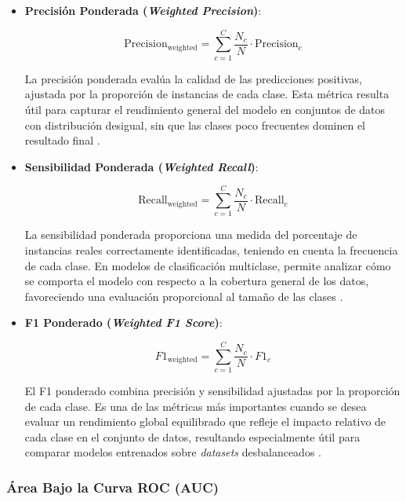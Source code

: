 \begin{itemize}

\item \textbf{Precisión Ponderada (\textit{Weighted Precision})}:

\begin{equation}
\text{Precision}_{\text{weighted}} = \sum_{c=1}^{C} \frac{N_c}{N} \cdot \text{Precision}_c
\end{equation}

La precisión ponderada evalúa la calidad de las predicciones positivas, ajustada por la proporción de instancias de cada clase. Esta métrica resulta útil para capturar el rendimiento general del modelo en conjuntos de datos con distribución desigual, sin que las clases poco frecuentes dominen el resultado final \cite{Girosi2004}.

\item \textbf{Sensibilidad Ponderada (\textit{Weighted Recall})}:

\begin{equation}
\text{Recall}_{\text{weighted}} = \sum_{c=1}^{C} \frac{N_c}{N} \cdot \text{Recall}_c
\end{equation}

La sensibilidad ponderada proporciona una medida del porcentaje de instancias reales correctamente identificadas, teniendo en cuenta la frecuencia de cada clase. En modelos de clasificación multiclase, permite analizar cómo se comporta el modelo con respecto a la cobertura general de los datos, favoreciendo una evaluación proporcional al tamaño de las clases \cite{Japkowicz2000}.

\item \textbf{F1 Ponderado (\textit{Weighted F1 Score})}:

\begin{equation}
F1_{\text{weighted}} = \sum_{c=1}^{C} \frac{N_c}{N} \cdot F1_c
\end{equation}

El F1 ponderado combina precisión y sensibilidad ajustadas por la proporción de cada clase. Es una de las métricas más importantes cuando se desea evaluar un rendimiento global equilibrado que refleje el impacto relativo de cada clase en el conjunto de datos, resultando especialmente útil para comparar modelos entrenados sobre \textit{datasets} desbalanceados \cite{Liu2011}.

\end{itemize}

\subsubsection*{Área Bajo la Curva ROC (AUC)}

